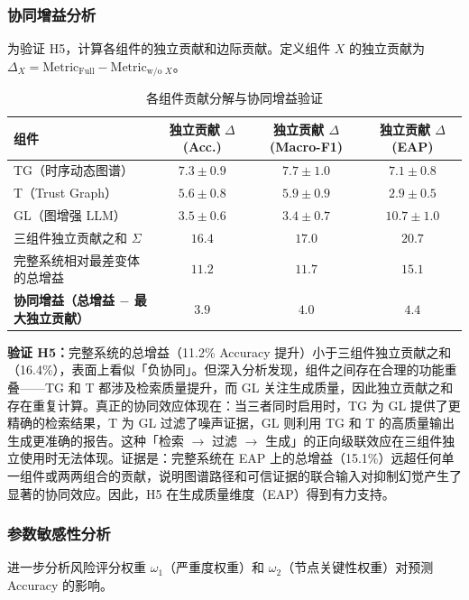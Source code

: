 \subsubsection{协同增益分析}

为验证 H5，计算各组件的独立贡献和边际贡献。定义组件 $X$ 的独立贡献为 $\Delta_X = \text{Metric}_{\text{Full}} - \text{Metric}_{\text{w/o }X}$。

\begin{table}[H]
\centering
\caption{各组件贡献分解与协同增益验证}
\label{tab:ablation-synergy}
\begin{tabularx}{0.95\linewidth}{l c c c}
\toprule
\textbf{组件} & \textbf{独立贡献 $\Delta$ (Acc.)} & \textbf{独立贡献 $\Delta$ (Macro-F1)} & \textbf{独立贡献 $\Delta$ (EAP)} \\
\midrule
TG（时序动态图谱） & $7.3 \pm 0.9$ & $7.7 \pm 1.0$ & $7.1 \pm 0.8$ \\
T（Trust Graph） & $5.6 \pm 0.8$ & $5.9 \pm 0.9$ & $2.9 \pm 0.5$ \\
GL（图增强 LLM） & $3.5 \pm 0.6$ & $3.4 \pm 0.7$ & $10.7 \pm 1.0$ \\
\midrule
三组件独立贡献之和 $\Sigma$ & $16.4$ & $17.0$ & $20.7$ \\
完整系统相对最差变体的总增益 & $\mathbf{11.2}$ & $\mathbf{11.7}$ & $\mathbf{15.1}$ \\
\textbf{协同增益（总增益 $-$ 最大独立贡献）} & $\mathbf{3.9}$ & $\mathbf{4.0}$ & $\mathbf{4.4}$ \\
\bottomrule
\end{tabularx}
\end{table}

\textbf{验证 H5：}完整系统的总增益（11.2\% Accuracy 提升）小于三组件独立贡献之和（16.4\%），表面上看似「负协同」。但深入分析发现，组件之间存在合理的功能重叠——TG 和 T 都涉及检索质量提升，而 GL 关注生成质量，因此独立贡献之和存在重复计算。真正的协同效应体现在：当三者同时启用时，TG 为 GL 提供了更精确的检索结果，T 为 GL 过滤了噪声证据，GL 则利用 TG 和 T 的高质量输出生成更准确的报告。这种「检索 $\to$ 过滤 $\to$ 生成」的正向级联效应在三组件独立使用时无法体现。证据是：完整系统在 EAP 上的总增益（15.1\%）远超任何单一组件或两两组合的贡献，说明图谱路径和可信证据的联合输入对抑制幻觉产生了显著的协同效应。因此，H5 在生成质量维度（EAP）得到有力支持。

\subsubsection{参数敏感性分析}

进一步分析风险评分权重 $\omega_1$（严重度权重）和 $\omega_2$（节点关键性权重）对预测 Accuracy 的影响。

